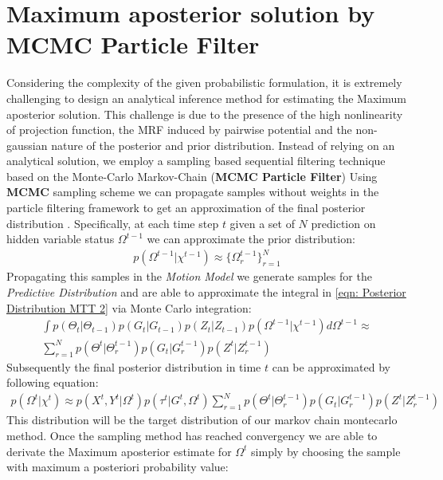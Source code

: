 \newpage
\section{Maximum aposterior solution by MCMC Particle Filter}
Considering the complexity of the given probabilistic formulation, it is extremely challenging to design an analytical inference method for estimating the Maximum aposterior solution. This challenge is due to the presence of the high nonlinearity of projection function, the MRF induced by pairwise potential and the non-gaussian nature of the posterior and prior distribution. 
Instead of relying on an analytical solution, we employ a sampling based sequential filtering technique based on the Monte-Carlo Markov-Chain (\textbf{MCMC Particle Filter})
Using \textbf{MCMC} sampling scheme we can propagate samples without weights in the particle filtering framework to get an approximation of the final posterior distribution .
Specifically, at each time step $t$ given a set of $N$ prediction on hidden variable status $\Omega^{t-1}$  we can approximate the prior distribution:
\begin{eqnarray} \label{eqn: Predictive Approximation}
p(\Omega^{t-1} |\chi^{t-1}) \approx \{ \Omega_r^{t-1} \}_{r=1}^N
\end{eqnarray}
Propagating this samples in the \textit{Motion Model} we generate samples for the \textit{Predictive Distribution} and are able to approximate the integral in \ref{eqn: Posterior Distribution MTT 2} via Monte Carlo integration:\\
\begin{eqnarray} \label{eqn: MonteCarlo Approx. Predictive}	
\int p(\Theta_{t} |\Theta_{t-1}) p(G_t |G_{t−1}) p(Z_t |Z_{t−1})p(\Omega^{t-1}|\chi^{t-1}) d\Omega^{t-1} \approx \\ \nonumber
\sum_{r=1}^{N} p(\Theta^{t} | \Theta^{t-1}_r) p(G_t |G^{t-1}_r) p(Z^t |Z^{t-1}_r) 
\end{eqnarray}
Subsequently the final posterior distribution in time $t$ can be approximated by following equation:
\begin{eqnarray} \label{eqn: Posterior Distribution MTT3}
p(\Omega^{t} |\chi^{t}) \approx  p(X^{t}, Y^t |\Omega^{t}) p(\tau^{t} | G^t ,\Omega^{t}) 
\sum_{r=1}^{N} p(\Theta^{t} | \Theta^{t-1}_r) p(G_t |G^{t-1}_r) p(Z^t |Z^{t-1}_r)
\end{eqnarray}
This distribution will be the target distribution of our markov chain montecarlo method.
Once the sampling method has reached convergency we are able to derivate the Maximum aposterior estimate for $\Omega^{t}$ simply by choosing the sample with maximum a posteriori probability value: \\
